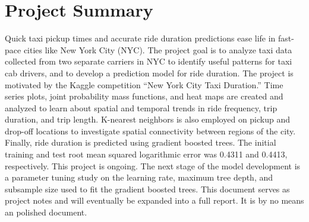 \documentclass[twocolumn,10pt]{article}
\begin{document}

\section{Project Summary}
Quick taxi pickup times and accurate ride duration predictions ease life in fast-pace cities like New York City (NYC). The project goal is to analyze taxi data collected from two separate carriers in NYC to identify useful patterns for taxi cab drivers, and to develop a prediction model for ride duration. The project is motivated by the Kaggle competition “New York City Taxi Duration.” Time series plots, joint probability mass functions, and heat maps are created and analyzed to learn about spatial and temporal trends in ride frequency, trip duration, and trip length. K-nearest neighbors is also employed on pickup and drop-off locations to investigate spatial connectivity between regions of the city. Finally, ride duration is predicted using gradient boosted trees. The initial training and test root mean squared logarithmic error was 0.4311 and 0.4413, respectively. This project is ongoing. The next stage of the model development is a parameter tuning study on the learning rate, maximum tree depth, and subsample size used to fit the gradient boosted trees. This document serves as project notes and will eventually be expanded into a full report. It is by no means an polished document.
\end{document}
